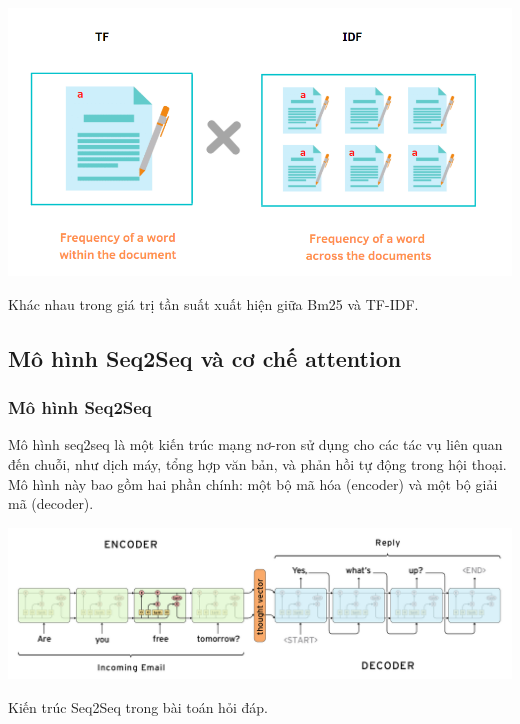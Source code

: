 \documentclass[a4paper, 12pt, openany]{book}
\begin{document}
\begin{minipage}{\linewidth}
    \captionsetup{type=figure}
    \centering
    \includegraphics[width=\linewidth]{./assets/images/tf-idf.png}
    \caption{Khác nhau trong giá trị tần suất xuất hiện giữa Bm25 và TF-IDF.}
\end{minipage}

\subsection{Mô hình Seq2Seq và cơ chế attention}
\subsubsection{Mô hình Seq2Seq}


Mô hình \ac{seq2seq} là một kiến trúc mạng nơ-ron sử dụng cho các tác vụ liên quan đến chuỗi, như dịch máy, tổng hợp văn bản, và phản hồi tự động trong hội thoại. Mô hình này bao gồm hai phần chính: một bộ mã hóa (encoder) và một bộ giải mã (decoder).

\begin{minipage}{\linewidth}
    \captionsetup{type=figure}
    \centering
    \includegraphics[width=\linewidth]{./assets/images/seq2seq.png}
    \caption{Kiến trúc Seq2Seq trong bài toán hỏi đáp.\cite{sutskever2014sequence}}
\end{minipage}

\vspace{0.5cm}
\end{document}
